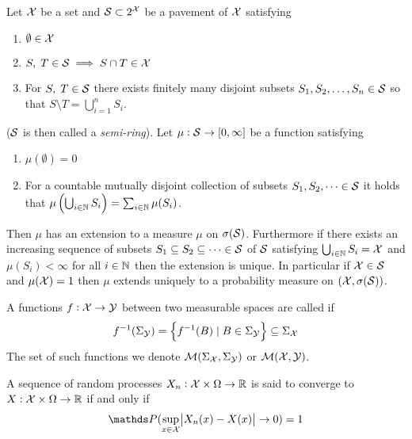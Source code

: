 \begin{thm}
  Let $\mathcal{X}$ be a set and $\mathcal{S} \subset 2^\mathcal{X}$ be a pavement of $\mathcal{X}$
  satisfying
  \begin{enumerate}
    \item $\emptyset \in \mathcal{X}$
    \item $S,\; T \in \mathcal{S} \implies S \cap T \in \mathcal{X}$
    \item For $S,\; T \in \mathcal{S}$ there exists finitely many disjoint
      subsets $S_1, S_2, \dots, S_n \in \mathcal{S}$ so that
      $ S \setminus T = \bigcup_{i=1}^n S_i$.
  \end{enumerate}
  ($\mathcal{S}$ is then called a \emph{semi-ring}).
  Let $\mu : \mathcal{S} \to [0,\infty]$ be a function satisfying
  \begin{enumerate}[label=\roman*.]
    \item $\mu(\emptyset) = 0$
    \item For a countable mutually disjoint collection of subsets
      $S_1, S_2, \dots \in \mathcal{S}$ it holds that
      $\mu\left( \bigcup_{i \in \mathbb{N}} S_i \right)
      = \sum_{i \in \mathbb{N}} \mu(S_i)$.
  \end{enumerate}
  Then $\mu$ has an extension to a measure $\mu$ on $\sigma(\mathcal{S})$.
  Furthermore if there exists an increasing sequence of subsets
  $S_1 \subseteq S_2 \subseteq \dots \in \mathcal{S}$ of $\mathcal{S}$
  satisfying $\bigcup_{i \in \mathbb{N}} S_i = \mathcal{X}$ and
  $\mu(S_i) < \infty$ for all $i \in \mathbb{N}$ then
  the extension is unique.
  In particular if $\mathcal{X} \in \mathcal{S}$ and $\mu(\mathcal{X})=1$ then
  $\mu$ extends uniquely to a probability measure on $(\mathcal{X}, \sigma(\mathcal{S}))$.
  \label{thm:caratheo}
\end{thm}

\begin{defn}
  A functions $f : \mathcal{X} \to \mathcal{Y}$ between two measurable spaces
  are called  if
  \[ f^{-1}(\Sigma_\mathcal{Y}) =
    \left\{ f^{-1}(B) \mid B \in \Sigma_\mathcal{Y} \right\}
  \subseteq \Sigma_\mathcal{X} \]
  The set of such functions we denote
  $\mathcal{M}(\Sigma_\mathcal{X}, \Sigma_\mathcal{Y})$ or $\mathcal{M}(\mathcal{X}, \mathcal{Y})$.
  \label{defn:measFunc}
\end{defn}

\begin{defn}
  A sequence of random processes $X_n : \mathcal{X} \times \Omega \to \mathbb{R}$
  is said to converge  to $X: \mathcal{X} \times \Omega \to \mathbb{R}$ if and only if
  \[ \Prob(\sup_{x \in \Cal{X}} \abs{X_n(x) - X(x)} \to 0) = 1 \]
\end{defn}

